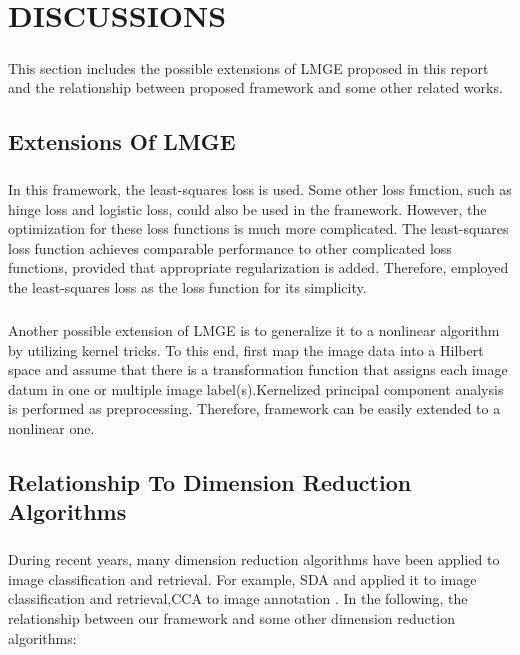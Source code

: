 \documentclass[a4paper,11pt]{report}
\begin{document}
\chapter{DISCUSSIONS
}
\paragraph{}
This section includes the possible extensions of LMGE proposed in this report and the relationship between proposed framework and some other related works.
\section{Extensions Of LMGE}
\paragraph{}In this framework, the least-squares loss is used. Some other loss function, such as hinge loss and logistic loss, could also be used in the framework. However, the optimization for these loss functions is much more complicated. The least-squares loss function achieves comparable performance to other complicated loss functions, provided that appropriate regularization is added. Therefore, employed the least-squares loss as the loss function for its simplicity.

\paragraph{}
Another possible extension of LMGE is to generalize it to a nonlinear algorithm by utilizing kernel tricks. To this end, first map the image data into a Hilbert space and assume that there is a transformation function that assigns each image datum in one or multiple image label(s).Kernelized principal component analysis is performed as preprocessing. Therefore, framework can be easily extended to a nonlinear one.

\section{Relationship To Dimension Reduction Algorithms }
\paragraph{}
During recent years, many dimension reduction algorithms have been applied to image classification and retrieval. For example, SDA and applied it to image classification and retrieval,CCA to image annotation . In the following, the relationship between our framework and some other dimension reduction algorithms:
\end{document}
